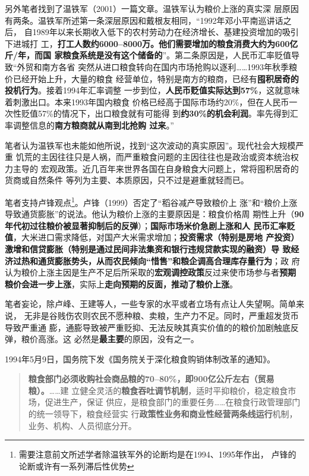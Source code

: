 另外笔者找到了温铁军（2001）一篇文章\cite{6cibodong}。温铁军认为粮价上涨的真实深
层原因有两条。温铁军所述第一条深层原因和戴根友相同，“1992年邓小平南巡讲话之后，
自1989年以来长期收入低下的农村劳动力在经济增长、基建投资增加的吸引下进城打
工，\textbf{打工人数约6000--8000万。他们需要增加的粮食消费大约为600亿斤/年，而国
  家粮食系统是没有这个储备的}”。第二条原因是，人民币汇率贬值导致“外贸和南方各省
突然从进口粮食转向在国内市场抢购以逐利……1993年秋季粮价已经开始上升，大量的粮食
经营单位，特别是南方的粮商，已经有\textbf{囤积居奇的投机行为}。接着1994年汇率调整
一步到位，\textbf{人民币贬值实际达到57\%}，这就意味着刺激出口。本来1993年国内粮食
价格已经高于国际市场约20\%，但在人民币一次性贬值57\%的情况下，出口粮食就有可能得
到\textbf{约30\%的机会利润}。率先得到汇率调整信息的\textbf{南方粮商就从南到北抢购
  过来}。”

笔者认为温铁军也未能如他所说，找到“这次波动的真实原因”。现代社会大规模严重
饥荒的主因往往只是人祸，而严重粮食问题的主因往往也是政治或资本统治权力主导的
宏观政策。近几百年来世界各国在自身粮食大问题上，常将囤积居奇的货商或自然条件
等列为主要、本质原因，只不过是避重就轻而已。

笔者支持卢锋观点\footnote{需要注意前文所述学者除温铁军外的论断均是在1994、1995年作出，
  卢锋的论断或许有一系列滞后性优势}。卢锋（1999）否定了“稻谷减产导致粮价上
涨”和“粮价上涨导致通货膨胀”的说法。他认为粮价上涨的主要原因是：粮食价格周
期性上升（\textbf{90年代初过往粮价被显著抑制后的反弹}）；\textbf{国际市场米价急剧上涨和人
  民币汇率贬值}，大米进口需求降低，对国产大米需求增加；\textbf{投资需求（特别是房地
  产投资）激增和信贷膨胀（特别是通过民间非法集资和银行违规贷款实现的融资）导
  致经济过热和通货膨胀势头，从而农民倾向“惜售”和粮企调高合理库存量行为}；政
府认为粮价上涨主因是生产不足后所采取的\textbf{宏观调控政策}反过来使市场参与者\textbf{预期
  粮价会进一步上涨}，实际上\textbf{走向预期的反面，推动了粮价上涨}。

笔者妄论，除卢峰、王建等人，一些专家的水平或者立场有点让人失望啊。简单来说，
无非是谷贱伤农则农民不愿种粮、卖粮，生产力不足。同时，严重超发货币导致严重通
膨，通膨导致被严重贬抑、无法反映其真实价值的的粮价加剧触底反弹，粮价高涨。这
必然是\textbf{最主要}的原因，没有之一。

1994年5月9日，国务院下发《国务院关于深化粮食购销体制改革的通知》。
\begin{quotation}
  \textbf{粮食部门必须收购社会商品粮的70--80\%，即900亿公斤左右（贸易粮）。}……建
  立健全灵活的\textbf{粮食吞吐调节机制}，适时平抑粮价，稳定粮食市场，促进生产，保证
  供应，是粮食部门的重要任务……在粮食行政管理部门的统一领导下，粮食经营实
  行\textbf{政策性业务和商业性经营两条线运行}机制，业务、机构、人员彻底分开。
\end{quotation}

